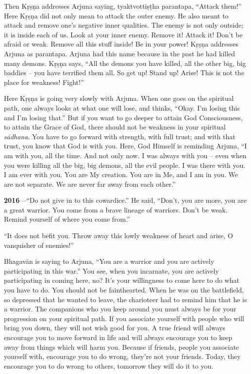 Then Kṛṣṇa addresses Arjuna saying, tyaktvottiṣṭha parantapa, “Attack them!” Here Kṛṣṇa did not only mean to attack the outer enemy. He also meant to attack and remove one’s negative inner qualities. The enemy is not only outside; it is inside each of us. Look at your inner enemy. Remove it! Attack it! Don’t be afraid or weak. Remove all this stuff inside! Be in your power! Kṛṣṇa addresses Arjuna as parantapa. Arjuna had this name because in the past he had killed many demons. Kṛṣṇa says, “All the demons you have killed, all the other big, big baddies -- you have terrified them all. So get up! Stand up! Arise! This is not the place for weakness! Fight!”

Here Kṛṣṇa is going very slowly with Arjuna. When one goes on the spiritual path, one always looks at what one will lose, and thinks, “Okay. I’m losing this and I’m losing that.” But if you want to go deeper to attain God Consciousness, to attain the Grace of God, there should not be weakness in your spiritual \textit{sādhana}. You have to go forward with strength, with full trust; and with that trust, you know that God is with you. Here, God Himself is reminding Arjuna, “I am with you, all the time. And not only now. I was always with you – even when you were killing all the big, big demons, all the evil people. I was there with you. I am ever with you. You are My creation. You are in Me, and I am in you. We are not separate. We are never far away from each other.”

\textbf{2016}---“Do not give in to this cowardice.” He said, “Don’t, you are more, you are a great warrior. You come from a brave lineage of warriors. Don’t be weak. Remind yourself of where you come from.”

“It does not befit you. Throw away this lowly weakness of heart and arise, O vanquisher of enemies!”

Bhagavān is saying to Arjuna, “You are a warrior and you are actively participating in this war.” You see, when you incarnate, you are actively participating in coming here, no? It’s your willingness to come here to do what you have to do. You should not be fainthearted. When he was on the battlefield, so depressed that he wanted to leave, the charioteer had to remind him that he is a warrior. The companions who you keep around you must always be for your progression on your spiritual path. If you associate yourself with people who will bring you down, they will not wish good for you. A true friend will always encourage you to move forward in life and will always encourage you to keep away from things which will harm you. Because if friends, people you associate yourself with, encourage you to do wrong, they're not your friends. Today, they encourage you to do wrong to others, tomorrow they will do it to you.


